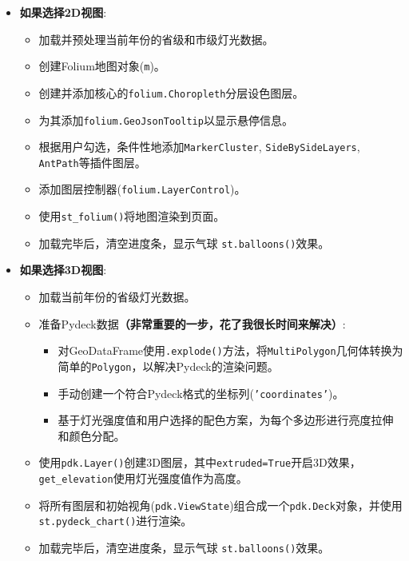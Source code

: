 \documentclass[14pt,a4paper,UTF8,twoside]{article}
\begin{document}
\begin{enumerate}
    
        \begin{itemize}
        \item \textbf{如果选择2D视图}:
            \begin{itemize}
                \item 加载并预处理当前年份的省级和市级灯光数据。
                \item 创建Folium地图对象(\texttt{m})。
                \item 创建并添加核心的\texttt{folium.Choropleth}分层设色图层。
                \item 为其添加\texttt{folium.GeoJsonTooltip}以显示悬停信息。
                \item 根据用户勾选，条件性地添加\texttt{MarkerCluster}, \texttt{SideBySideLayers}, \texttt{AntPath}等插件图层。
                \item 添加图层控制器(\texttt{folium.LayerControl})。
                \item 使用\texttt{st\_folium()}将地图渲染到页面。
                \item 加载完毕后，清空进度条，显示气球 \texttt{st.balloons()}效果。
            \end{itemize}
        \item \textbf{如果选择3D视图}:
            \begin{itemize}
                \item 加载当前年份的省级灯光数据。
                \item 准备Pydeck数据\textbf{（非常重要的一步，花了我很长时间来解决）}:
                    \begin{itemize}
                        \item 对GeoDataFrame使用\texttt{.explode()}方法，将\texttt{MultiPolygon}几何体转换为简单的\texttt{Polygon}，以解决Pydeck的渲染问题。
                        \item 手动创建一个符合Pydeck格式的坐标列(\texttt{'coordinates'})。
                        \item 基于灯光强度值和用户选择的配色方案，为每个多边形进行亮度拉伸和颜色分配。
                    \end{itemize}
                \item  使用\texttt{pdk.Layer()}创建3D图层，其中\texttt{extruded=True}开启3D效果，\texttt{get\_elevation}使用灯光强度值作为高度。
                \item 将所有图层和初始视角(\texttt{pdk.ViewState})组合成一个\texttt{pdk.Deck}对象，并使用\texttt{st.pydeck\_chart()}进行渲染。
                \item 加载完毕后，清空进度条，显示气球 \texttt{st.balloons()}效果。
            \end{itemize}
    \end{itemize}
    


\end{enumerate}
\end{document}
